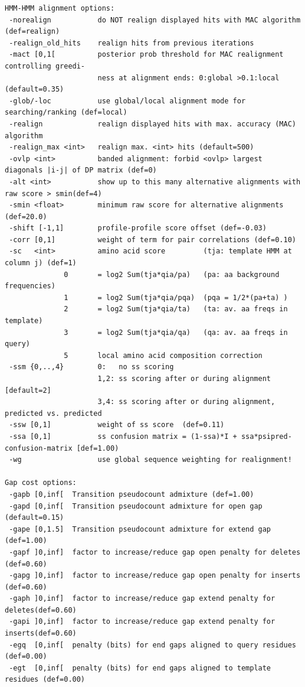 \documentclass[11pt,a4paper]{article}
\begin{document}
\begin{verbatim}
HMM-HMM alignment options:                                                       
 -norealign           do NOT realign displayed hits with MAC algorithm (def=realign)   
 -realign_old_hits    realign hits from previous iterations                          
 -mact [0,1[          posterior prob threshold for MAC realignment controlling greedi- 
                      ness at alignment ends: 0:global >0.1:local (default=0.35)       
 -glob/-loc           use global/local alignment mode for searching/ranking (def=local)
 -realign             realign displayed hits with max. accuracy (MAC) algorithm 
 -realign_max <int>   realign max. <int> hits (default=500)                        
 -ovlp <int>          banded alignment: forbid <ovlp> largest diagonals |i-j| of DP matrix (def=0)
 -alt <int>           show up to this many alternative alignments with raw score > smin(def=4)  
 -smin <float>        minimum raw score for alternative alignments (def=20.0)  
 -shift [-1,1]        profile-profile score offset (def=-0.03)                         
 -corr [0,1]          weight of term for pair correlations (def=0.10)                
 -sc   <int>          amino acid score         (tja: template HMM at column j) (def=1)
              0       = log2 Sum(tja*qia/pa)   (pa: aa background frequencies)    
              1       = log2 Sum(tja*qia/pqa)  (pqa = 1/2*(pa+ta) )               
              2       = log2 Sum(tja*qia/ta)   (ta: av. aa freqs in template)     
              3       = log2 Sum(tja*qia/qa)   (qa: av. aa freqs in query)        
              5       local amino acid composition correction                     
 -ssm {0,..,4}        0:   no ss scoring                                             
                      1,2: ss scoring after or during alignment  [default=2]         
                      3,4: ss scoring after or during alignment, predicted vs. predicted
 -ssw [0,1]           weight of ss score  (def=0.11)                                  
 -ssa [0,1]           ss confusion matrix = (1-ssa)*I + ssa*psipred-confusion-matrix [def=1.00)
 -wg                  use global sequence weighting for realignment!                   

Gap cost options:                                                                
 -gapb [0,inf[  Transition pseudocount admixture (def=1.00)                     
 -gapd [0,inf[  Transition pseudocount admixture for open gap (default=0.15)    
 -gape [0,1.5]  Transition pseudocount admixture for extend gap (def=1.00)      
 -gapf ]0,inf]  factor to increase/reduce gap open penalty for deletes (def=0.60) 
 -gapg ]0,inf]  factor to increase/reduce gap open penalty for inserts (def=0.60) 
 -gaph ]0,inf]  factor to increase/reduce gap extend penalty for deletes(def=0.60)
 -gapi ]0,inf]  factor to increase/reduce gap extend penalty for inserts(def=0.60)
 -egq  [0,inf[  penalty (bits) for end gaps aligned to query residues (def=0.00) 
 -egt  [0,inf[  penalty (bits) for end gaps aligned to template residues (def=0.00)


\end{verbatim}
\end{document}
